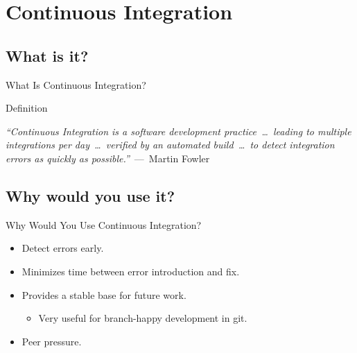 \documentclass[xcolor=dvipsnames]{beamer}
\begin{document}
  \section{Continuous Integration}
    \subsection{What is it?}
      \begin{frame}{What Is Continuous Integration?}
        \begin{center}\begin{minipage}{0.8\linewidth}\begin{block}{Definition\footnotemark[2]}

              \emph{``Continuous Integration is a software development
              practice~\dots\ leading to multiple integrations per day~\dots\
              verified by an automated build~\dots\ to detect integration errors
              as quickly as possible.''}~---~Martin Fowler

        \end{block}\end{minipage}\end{center}

      \end{frame}

    \subsection{Why would you use it?}
      \begin{frame}{Why Would You Use Continuous Integration?}
        \Large
        \begin{itemize}
          \pause\item Detect errors early.
          \vspace{\baselineskip}
          \pause\item Minimizes time between error introduction and fix.
          \vspace{\baselineskip}
          \pause\item Provides a stable base for future work.
          \begin{itemize}
            \pause \item \large Very useful for branch-happy development in git.
          \end{itemize}
          \vspace{0.5\baselineskip}
          \pause\item Peer pressure.
        \end{itemize}
      \end{frame}
\end{document}
